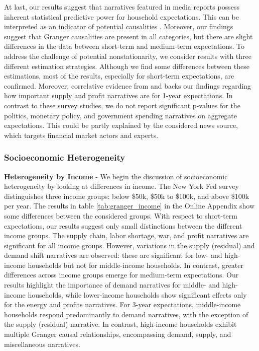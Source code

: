 At last,  our results suggest that narratives featured in media reports possess inherent statistical predictive power for household expectations. This can be interpreted as an indicator of potential causalities \cite{shojaie.2022}. Moreover, our findings suggest that Granger causalities are present in all categories, but there are slight differences in the data between short-term and medium-term expectations.  To address the challenge of potential nonstationarity, we consider results with three different estimation strategies. Although we find some differences between these estimations, most of the results, especially for short-term expectations, are confirmed. Moreover, correlative evidence from \cite{Andre.2023} and \cite{Stantcheva.2024} backs our findings regarding how important supply and profit narratives are for 1-year expectations. In contrast to these survey studies, we do not report significant p-values for the politics, monetary policy, and government spending narratives on aggregate expectations. This could be partly explained by the considered news source, which targets financial market actors and experts. 



\subsubsection{Socioeconomic Heterogeneity}

\textbf{Heterogeneity by Income} - We begin the discussion of socioeconomic heterogeneity by looking at differences in income. The New York Fed survey distinguishes three income groups: below \$50k, \$50k to \$100k, and above \$100k per year. The results in table \ref{tab:granger_income} in the Online Appendix show some differences between the considered groups. With respect to short-term expectations, our results suggest only small distinctions between the different income groups. The supply chain, labor shortage, war, and profit narratives are significant for all income groups. However, variations in the supply (residual) and demand shift narratives are observed: these are significant for low- and high-income households but not for middle-income households. In contrast, greater differences across income groups emerge for medium-term expectations. Our results highlight the importance of demand narratives for middle- and high-income households, while lower-income households show significant effects only for the energy and profits narratives. For 3-year expectations, middle-income households respond predominantly to demand narratives, with the exception of the supply (residual) narrative. In contrast, high-income households exhibit multiple Granger causal relationships, encompassing demand, supply, and miscellaneous narratives.\\


